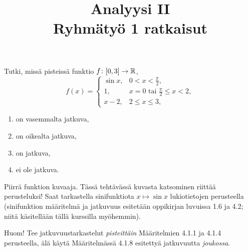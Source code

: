 \documentclass[11pt,a4paper]{amsart}
\title{Analyysi II\\Ryhmätyö 1 ratkaisut}
\author{}
\date{}
\begin{document}

\begin{exercise}
  Tutki, missä pisteissä funktio \(f\colon [0,3] \to \mathbb{R}\),
  \[
    f(x) =
    \begin{cases}
      \sin x, & 0 < x < \frac{\pi}{2},\\
      1, & x = 0 \text{ tai } \frac{\pi}{2} \leqslant x < 2,\\
      x - 2, & 2 \leqslant x \leqslant 3,
    \end{cases}
  \]
  \begin{enumerate}[label=(\alph*), nosep]
    \item on vasemmalta jatkuva,
    \item on oikealta jatkuva,
    \item on jatkuva,
    \item ei ole jatkuva.
  \end{enumerate}
  Piirrä funktion kuvaaja. Tässä tehtävässä kuvasta katsominen riittää
  perusteluksi! Saat tarkastella sinifunktiota \(x \mapsto \sin x\)
  lukiotietojen perusteella (sinifunktion määritelmä ja jatkuvuus esitetään
  oppikirjan luvuissa 1.6 ja 4.2; niitä käsitellään tällä kurssilla myöhemmin).

  Huom! Tee jatkuvuustarkastelut \emph{pisteittäin} Määritelmien 4.1.1 ja
  4.1.4 perusteella, älä käytä Määritelmässä 4.1.8 esitettyä jatkuvuutta
  \emph{joukossa}.
\end{exercise}
\end{document}
